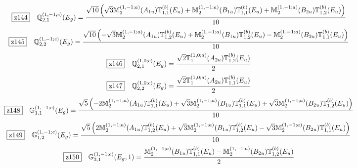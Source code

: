 \documentclass[fleqn,10pt,landscape]{jsarticle}
\begin{document}
\begin{dmath*}
\hspace*{3mm}\fbox{z144}\quad \mathbb{Q}_{2,1}^{(1,-1;c)}(E_{g})=\frac{\sqrt{10} \left(\sqrt{3} \mathbb{M}_{2}^{(1,-1;a)}(A_{1u}) \mathbb{T}_{1,1}^{(b)}(E_{u}) + \mathbb{M}_{2}^{(1,-1;a)}(B_{1u}) \mathbb{T}_{1,1}^{(b)}(E_{u}) + \mathbb{M}_{2}^{(1,-1;a)}(B_{2u}) \mathbb{T}_{1,2}^{(b)}(E_{u})\right)}{10}
\end{dmath*}
\begin{dmath*}
\hspace*{3mm}\fbox{z145}\quad \mathbb{Q}_{2,2}^{(1,-1;c)}(E_{g})=\frac{\sqrt{10} \left(- \sqrt{3} \mathbb{M}_{2}^{(1,-1;a)}(A_{1u}) \mathbb{T}_{1,2}^{(b)}(E_{u}) + \mathbb{M}_{2}^{(1,-1;a)}(B_{1u}) \mathbb{T}_{1,2}^{(b)}(E_{u}) - \mathbb{M}_{2}^{(1,-1;a)}(B_{2u}) \mathbb{T}_{1,1}^{(b)}(E_{u})\right)}{10}
\end{dmath*}
\begin{dmath*}
\hspace*{3mm}\fbox{z146}\quad \mathbb{Q}_{2,1}^{(1,0;c)}(E_{g})=\frac{\sqrt{2} \mathbb{T}_{1}^{(1,0;a)}(A_{2u}) \mathbb{T}_{1,2}^{(b)}(E_{u})}{2}
\end{dmath*}
\begin{dmath*}
\hspace*{3mm}\fbox{z147}\quad \mathbb{Q}_{2,2}^{(1,0;c)}(E_{g})=\frac{\sqrt{2} \mathbb{T}_{1}^{(1,0;a)}(A_{2u}) \mathbb{T}_{1,1}^{(b)}(E_{u})}{2}
\end{dmath*}
\begin{dmath*}
\hspace*{3mm}\fbox{z148}\quad \mathbb{G}_{1,1}^{(1,-1;c)}(E_{g})=\frac{\sqrt{5} \left(- 2 \mathbb{M}_{2}^{(1,-1;a)}(A_{1u}) \mathbb{T}_{1,1}^{(b)}(E_{u}) + \sqrt{3} \mathbb{M}_{2}^{(1,-1;a)}(B_{1u}) \mathbb{T}_{1,1}^{(b)}(E_{u}) + \sqrt{3} \mathbb{M}_{2}^{(1,-1;a)}(B_{2u}) \mathbb{T}_{1,2}^{(b)}(E_{u})\right)}{10}
\end{dmath*}
\begin{dmath*}
\hspace*{3mm}\fbox{z149}\quad \mathbb{G}_{1,2}^{(1,-1;c)}(E_{g})=\frac{\sqrt{5} \left(2 \mathbb{M}_{2}^{(1,-1;a)}(A_{1u}) \mathbb{T}_{1,2}^{(b)}(E_{u}) + \sqrt{3} \mathbb{M}_{2}^{(1,-1;a)}(B_{1u}) \mathbb{T}_{1,2}^{(b)}(E_{u}) - \sqrt{3} \mathbb{M}_{2}^{(1,-1;a)}(B_{2u}) \mathbb{T}_{1,1}^{(b)}(E_{u})\right)}{10}
\end{dmath*}
\begin{dmath*}
\hspace*{3mm}\fbox{z150}\quad \mathbb{G}_{3,1}^{(1,-1;c)}(E_{g},1)=\frac{\mathbb{M}_{2}^{(1,-1;a)}(B_{1u}) \mathbb{T}_{1,1}^{(b)}(E_{u}) - \mathbb{M}_{2}^{(1,-1;a)}(B_{2u}) \mathbb{T}_{1,2}^{(b)}(E_{u})}{2}
\end{dmath*}
\end{document}
